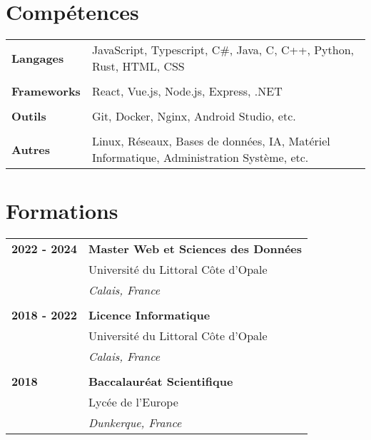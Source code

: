\documentclass[a4paper, 12pt]{article}
\begin{document}
\begin{minipage}[t]{0.65\textwidth}

    \section*{\textcolor{sectioncolor}{Compétences}}
    \begin{tabular}{ m{} m{} }
        \textbf{Langages} & JavaScript, Typescript, C\#, Java, C, C++, Python, Rust, HTML, CSS \\
        & \\
        \textbf{Frameworks} & React, Vue.js, Node.js, Express, .NET \\
        & \\
        \textbf{Outils} & Git, Docker, Nginx, Android Studio, etc. \\
        & \\
        \textbf{Autres} & Linux, Réseaux, Bases de données, IA, Matériel Informatique, Administration Système, etc. \\
    \end{tabular}

    \vspace{-0.4cm}

    \section*{\textcolor{sectioncolor}{Formations}}
    \begin{tabular}{ m{} m{} }
        \textbf{2022 - 2024} & \textbf{Master Web et Sciences des Données} \\
        & Université du Littoral Côte d'Opale \\
        & \textit{Calais, France} \\
        & \\
        \textbf{2018 - 2022} & \textbf{Licence Informatique} \\
        & Université du Littoral Côte d'Opale \\
        & \textit{Calais, France} \\
        & \\
        \textbf{2018} & \textbf{Baccalauréat Scientifique} \\
        & Lycée de l'Europe \\
        & \textit{Dunkerque, France} \\
    \end{tabular}


\end{minipage}
\end{document}
